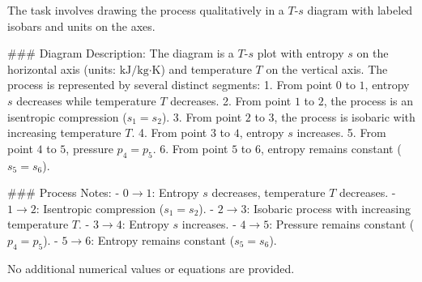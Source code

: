 The task involves drawing the process qualitatively in a \( T \)-\( s \) diagram with labeled isobars and units on the axes.  

### Diagram Description:  
The diagram is a \( T \)-\( s \) plot with entropy \( s \) on the horizontal axis (units: \( \text{kJ/kg·K} \)) and temperature \( T \) on the vertical axis. The process is represented by several distinct segments:  
1. From point \( 0 \) to \( 1 \), entropy \( s \) decreases while temperature \( T \) decreases.  
2. From point \( 1 \) to \( 2 \), the process is an isentropic compression (\( s_1 = s_2 \)).  
3. From point \( 2 \) to \( 3 \), the process is isobaric with increasing temperature \( T \).  
4. From point \( 3 \) to \( 4 \), entropy \( s \) increases.  
5. From point \( 4 \) to \( 5 \), pressure \( p_4 = p_5 \).  
6. From point \( 5 \) to \( 6 \), entropy remains constant (\( s_5 = s_6 \)).  

### Process Notes:  
- \( 0 \rightarrow 1 \): Entropy \( s \) decreases, temperature \( T \) decreases.  
- \( 1 \rightarrow 2 \): Isentropic compression (\( s_1 = s_2 \)).  
- \( 2 \rightarrow 3 \): Isobaric process with increasing temperature \( T \).  
- \( 3 \rightarrow 4 \): Entropy \( s \) increases.  
- \( 4 \rightarrow 5 \): Pressure remains constant (\( p_4 = p_5 \)).  
- \( 5 \rightarrow 6 \): Entropy remains constant (\( s_5 = s_6 \)).  

No additional numerical values or equations are provided.
